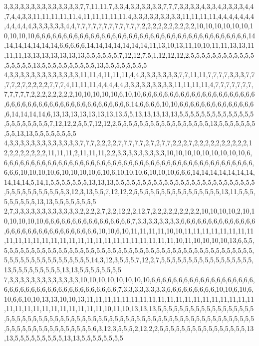 3,3,3,3,3,3,3,3,3,3,3,3,3,3,7,7,11,11,7,3,3,4,3,3,3,3,3,3,7,7,7,3,3,3,3,4,3,3,4,3,3,3,3,4,4,7,4,4,3,3,11,11,11,11,11,4,11,11,11,11,11,4,3,3,3,3,3,3,3,3,3,11,11,11,11,4,4,4,4,4,4,4,4,4,4,4,4,3,3,3,3,3,3,4,4,7,7,7,7,7,7,7,7,7,7,7,7,2,2,2,2,2,2,2,2,2,2,10,10,10,10,10,10,10,10,10,10,6,6,6,6,6,6,6,6,6,6,6,6,6,6,6,6,6,6,6,6,6,6,6,6,6,6,6,6,6,6,6,6,6,6,6,6,6,6,6,14,14,14,14,14,14,14,6,6,6,6,6,14,14,14,14,14,14,14,11,13,10,13,11,10,10,11,11,13,13,11,11,11,13,13,13,13,13,13,13,5,5,5,5,5,5,7,12,12,7,5,1,12,12,12,2,5,5,5,5,5,5,5,5,5,5,5,5,5,5,5,5,5,13,5,5,5,5,5,5,5,5,5,5,13,5,5,5,5,5,5,5,5
4,3,3,3,3,3,3,3,3,3,3,3,3,3,11,11,4,11,11,11,4,4,3,3,3,3,3,3,3,7,7,11,11,7,7,7,7,3,3,3,7,7,7,7,2,7,2,2,2,2,7,7,7,4,11,11,11,4,4,4,4,4,3,3,3,3,3,3,3,3,3,11,11,11,11,4,7,7,7,7,7,7,7,7,7,7,7,7,2,2,2,2,2,2,2,2,10,10,10,10,10,6,10,10,6,6,6,6,6,6,6,6,6,6,6,6,6,6,6,6,6,6,6,6,6,6,6,6,6,6,6,6,6,6,6,6,6,6,6,6,6,6,6,6,6,6,6,6,14,6,6,6,6,10,10,6,6,6,6,6,6,6,6,6,6,6,6,6,6,6,14,14,14,14,6,13,13,13,13,13,13,13,13,5,5,13,13,13,13,13,5,5,5,5,5,5,5,5,5,5,5,5,5,5,5,5,5,5,5,5,5,5,7,12,12,2,5,5,7,12,12,2,5,5,5,5,5,5,5,5,5,5,5,5,5,5,5,5,5,13,5,5,5,5,5,5,5,5,5,13,13,5,5,5,5,5,5,5,5
4,3,3,3,3,3,3,3,3,3,3,3,3,3,7,7,7,2,2,2,2,7,7,7,7,7,2,7,2,7,7,2,2,2,7,2,2,2,2,2,2,2,2,2,2,12,2,2,2,2,2,2,2,11,11,11,2,11,11,11,2,2,3,3,3,3,3,3,3,3,3,10,10,10,10,10,10,10,10,10,6,6,6,6,6,6,6,6,6,6,6,6,6,6,6,6,6,6,6,6,6,6,6,6,6,6,6,6,6,6,6,6,6,6,6,6,6,6,6,6,6,6,6,6,6,6,6,6,6,6,10,10,10,10,6,10,10,10,10,6,10,6,10,10,10,6,10,10,10,6,6,6,14,14,14,14,14,14,14,14,14,14,5,14,1,5,5,5,5,5,5,5,13,13,13,5,5,5,5,5,5,5,5,5,5,5,5,5,5,5,5,5,5,5,5,5,5,5,5,5,5,5,5,5,5,5,5,5,5,5,5,5,3,12,3,13,5,5,7,12,12,2,5,5,5,5,5,5,5,5,5,5,5,5,5,5,5,5,13,11,5,5,5,5,5,5,5,5,5,13,13,5,5,5,5,5,5,5,5
2,7,3,3,3,3,3,3,3,3,3,3,3,3,2,2,2,2,7,2,2,12,2,2,12,7,2,2,2,2,2,2,2,2,2,10,10,10,10,2,10,10,10,10,10,10,6,6,6,6,6,6,6,6,6,6,6,6,6,6,6,6,7,3,3,3,3,3,3,3,3,6,6,6,6,6,6,6,6,6,6,6,6,6,6,6,6,6,6,6,6,6,6,6,6,6,6,6,6,6,6,6,10,10,6,10,11,11,11,11,10,10,11,11,11,11,11,11,11,11,11,11,11,11,11,11,11,11,11,11,11,11,11,11,11,11,11,11,11,10,11,10,10,10,10,13,6,5,5,5,5,5,5,5,5,5,5,5,5,5,5,5,5,5,5,5,5,5,5,5,5,5,5,5,5,5,5,5,5,5,5,5,5,5,5,5,5,5,5,5,5,5,5,5,5,5,5,5,5,5,5,5,5,5,5,5,5,5,5,5,5,14,3,12,3,5,5,5,7,12,2,7,5,5,5,5,5,5,5,5,5,5,5,5,5,5,5,5,5,13,5,5,5,5,5,5,5,5,5,13,13,5,5,5,5,5,5,5,5
7,3,3,3,3,3,3,3,3,3,3,3,3,3,10,10,10,10,10,10,10,10,6,6,6,6,6,6,6,6,6,6,6,6,6,6,6,6,6,6,6,6,6,6,6,6,6,6,6,6,6,6,6,6,6,6,6,6,6,6,6,6,7,3,3,3,3,3,3,3,3,6,6,6,6,6,6,6,6,6,10,10,6,10,6,10,6,6,10,10,13,13,10,10,13,11,11,11,11,11,11,11,11,11,11,11,11,11,11,11,11,11,11,11,11,11,11,11,11,11,11,11,11,11,11,10,11,10,13,13,13,5,5,5,5,5,5,5,5,5,5,5,5,5,5,5,5,5,5,5,5,5,5,5,5,5,5,5,5,5,5,5,5,5,5,5,5,5,5,5,5,5,5,5,5,5,5,5,5,5,5,5,5,5,5,5,5,5,5,5,5,5,5,5,5,5,5,5,5,5,5,5,5,5,5,5,5,5,5,5,5,6,3,12,3,5,5,5,2,12,2,2,5,5,5,5,5,5,5,5,5,5,5,5,5,5,5,5,13,13,5,5,5,5,5,5,5,5,5,13,13,5,5,5,5,5,5,5,5
